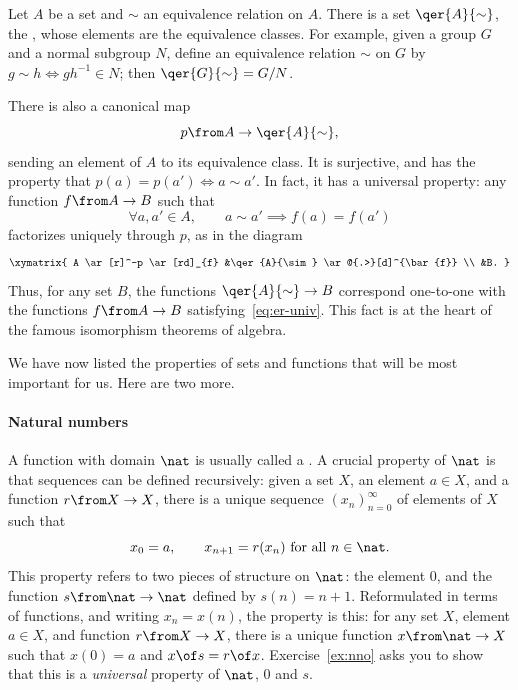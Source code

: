 Let $A$ be a set and $\sim$ an equivalence%
%
%
relation on $A$.  There is a set $\qer{A}{\sim}$,%
%
%
the ,%
%
%
%   
whose elements are the equivalence classes.  For example, given a group $G$
and a normal subgroup $N$, define an equivalence relation $\sim$ on $G$ by
$g \sim h \iff gh^{-1} \in N$; then $\qer{G}{\sim} = G/N$.

There is also a canonical map
\[
p\from A \to \qer{A}{\sim},
\]
sending an element of $A$ to its equivalence class.  It is surjective, and has
the property that $p(a) = p(a') \iff a \sim a'$.  In fact, it has a universal
property: any function $f\from A \to B$ such that
% 
\begin{equation}        
\label{eq:er-univ}
\forall a, a' \in A,
\qquad
a \sim a'
\implies
f(a) = f(a')
\end{equation}
% 
factorizes uniquely through $p$, as in the diagram
\[
\xymatrix{
A \ar[r]^-p \ar[rd]_{f}  &\qer{A}{\sim} \ar@{.>}[d]^{\bar{f}}    \\
                        &B.
}
\]
Thus, for any set $B$, the functions $\qer{A}{\sim} \to B$ correspond
one-to-one with the functions $f\from A \to B$
satisfying~\eqref{eq:er-univ}.  This fact is at the heart of the famous
isomorphism theorems of algebra.

\subjectchange

We have now listed the properties of sets and functions that will be most
important for us.  Here are two more.

\paragraph*{Natural numbers}  
%
%
A function with domain $\nat$ is usually called a .%
%
%
A crucial property of $\nat$ is that sequences can be defined recursively:
given a set $X$, an element $a \in X$, and a function $r\from X \to X$,
there is a unique sequence $(x_n)_{n = 0}^\infty$ of elements of $X$ such
that
\[
x_0 = a,
\qquad
x_{n + 1} = r(x_n) \text{ for all } n \in \nat.
\]
This property refers to two pieces of structure on $\nat$: the element $0$,
and the function $s\from \nat \to \nat$ defined by $s(n) = n + 1$.
Reformulated in terms of functions, and writing $x_n = x(n)$, the property
is this: for any set $X$, element $a \in X$, and function $r\from X \to X$,
there is a unique function $x\from \nat \to X$ such that $x(0) = a$ and
$x\of s = r \of x$.  Exercise~\ref{ex:nno} asks you to show that this is a
\emph{universal} property of $\nat$, $0$ and $s$.

